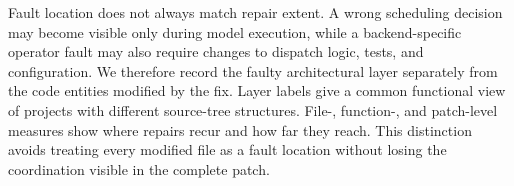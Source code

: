 Fault location does not always match repair extent. A wrong scheduling decision may become visible only during model execution, while a backend-specific operator fault may also require changes to dispatch logic, tests, and configuration. We therefore record the faulty architectural layer separately from the code entities modified by the fix. Layer labels give a common functional view of projects with different source-tree structures. File-, function-, and patch-level measures show where repairs recur and how far they reach. This distinction avoids treating every modified file as a fault location without losing the coordination visible in the complete patch.
